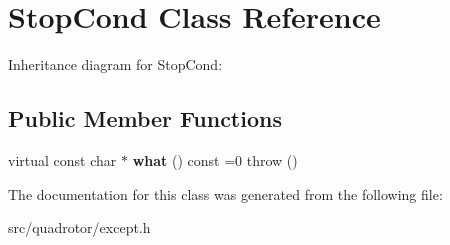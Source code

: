 \hypertarget{classStopCond}{
\section{StopCond Class Reference}
\label{classStopCond}
}
Inheritance diagram for StopCond:\subsection*{Public Member Functions}
\begin{DoxyCompactItemize}
\item 
\hypertarget{classStopCond_aa359d703fac6691cd13f0b8c4df62d68}{
virtual const char $\ast$ {\bfseries what} () const =0  throw ()}
\label{classStopCond_aa359d703fac6691cd13f0b8c4df62d68}

\end{DoxyCompactItemize}


The documentation for this class was generated from the following file:\begin{DoxyCompactItemize}
\item 
src/quadrotor/except.h\end{DoxyCompactItemize}
